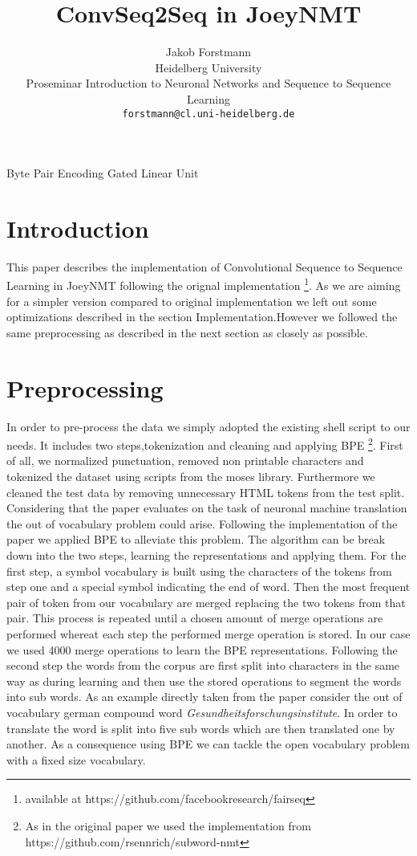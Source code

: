 \documentclass[11pt]{article}
\title{ConvSeq2Seq in JoeyNMT}
\author{Jakob Forstmann \\
  Heidelberg University \\
  Proseminar Introduction to Neuronal Networks and Sequence to Sequence Learning\\
  \texttt{forstmann@cl.uni-heidelberg.de}}
\begin{document}
\maketitle
{} {Byte Pair Encoding}
 {Gated Linear Unit}
\section{Introduction}
This paper describes the  implementation of Convolutional Sequence to Sequence Learning in JoeyNMT\cite{Joey} following the orignal implementation \footnote{ available at https://github.com/facebookresearch/fairseq}. As we are aiming for a simpler version compared to original implementation we  left out some optimizations described in the section Implementation.However we followed 
the same preprocessing as described in the next section as closely as possible.
\section{Preprocessing}
In order to pre-process the data we simply adopted  the existing shell script to our needs. It includes two steps,tokenization and cleaning and applying \ac{BPE} \footnote{ As in the original paper we used the implementation from https://github.com/rsennrich/subword-nmt}.
First of all, we normalized punctuation, removed non printable characters and tokenized the dataset using scripts from the moses library. 
Furthermore we cleaned the test data by removing unnecessary HTML tokens from the test split. 
Considering that the paper\cite{conv} evaluates on the task of neuronal machine translation the out of vocabulary problem could arise.
Following the implementation of the paper we applied \ac{BPE}\cite{NMT} to alleviate this problem. The algorithm can be break down into the two steps, learning the representations and applying them.
For the first step, a symbol vocabulary is built using the characters of the tokens from step one and a special symbol indicating the end of word. Then the most frequent pair of token from our vocabulary are merged replacing the two tokens from that pair. This process is repeated until  a chosen amount of merge operations are performed whereat each step the performed merge operation is stored. 
In our case we used 4000 merge operations to learn the \ac{BPE} representations. 
Following the second step the words from the corpus are first split  into characters in the same way as during learning and then use the stored operations to segment the words into sub words. 
As an example directly taken from the paper consider the out of vocabulary german compound word \textit{Gesundheitsforschungsinstitute}. In order to translate the word is split into five sub words which are then translated one by another. As a consequence using \ac{BPE} we can tackle the open vocabulary problem with a fixed size vocabulary.
\end{document}
